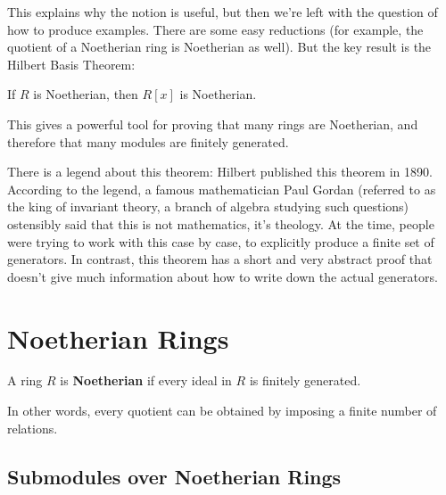 This explains why the notion is useful, but then we're left with the question of how to produce examples. There are some easy reductions (for example, the quotient of a Noetherian ring is Noetherian as well). But the key result is the Hilbert Basis Theorem:

\begin{theorem}
    If $R$ is Noetherian, then $R[x]$ is Noetherian. 
\end{theorem}

This gives a powerful tool for proving that many rings are Noetherian, and therefore that many modules are finitely generated. 

\begin{note}
    There is a legend about this theorem: Hilbert published this theorem in 1890. According to the legend, a famous mathematician Paul Gordan (referred to as the king of invariant theory, a branch of algebra studying such questions) ostensibly said that this is not mathematics, it's theology. At the time, people were trying to work with this case by case, to explicitly produce a finite set of generators. In contrast, this theorem has a short and very abstract proof that doesn't give much information about how to write down the actual generators. 
\end{note}




\section{Noetherian Rings}

\vspace{0.75em}

\begin{definition}
    A ring $R$ is \textbf{Noetherian} if every ideal in $R$ is finitely generated. 
\end{definition}

In other words, every quotient can be obtained by imposing a finite number of relations. 
\subsection{Submodules over Noetherian Rings}

